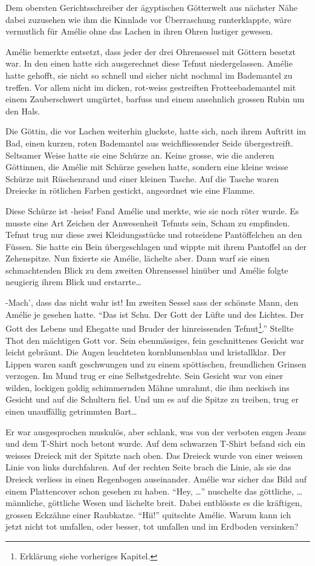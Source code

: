 \documentclass[11pt,titlepage,a5paper]{book}
\begin{document}
Dem obersten Gerichtsschreiber der ägyptischen Götterwelt aus nächster Nähe dabei zuzusehen wie ihm die Kinnlade vor Überraschung runterklappte, wäre vermutlich für Amélie ohne das Lachen in ihren Ohren lustiger gewesen.

Amélie bemerkte entsetzt, dass jeder der drei Ohrensessel mit Göttern besetzt war. In den einen hatte sich ausgerechnet diese Tefnut niedergelassen. Amélie hatte gehofft, sie nicht so schnell und sicher nicht nochmal im Bademantel zu treffen. Vor allem nicht im dicken, rot-weiss gestreiften Frotteebademantel mit einem Zauberschwert umgürtet, barfuss und einem ansehnlich grossen Rubin um den Hals. 

Die Göttin, die vor Lachen weiterhin gluckste, hatte sich, nach ihrem Auftritt im Bad, einen kurzen, roten Bademantel aus weichfliessender Seide übergestreift. Seltsamer Weise hatte sie eine Schürze an. Keine grosse, wie die anderen Göttinnen, die Amélie mit Schürze gesehen hatte, sondern eine kleine weisse Schürze mit Rüschenrand und einer kleinen Tasche. Auf die Tasche waren Dreiecke in rötlichen Farben gestickt, angeordnet wie eine Flamme.

 Diese Schürze ist -heiss! Fand Amélie und merkte, wie sie noch röter wurde. Es musste eine Art Zeichen der Anwesenheit Tefnuts sein, Scham zu empfinden. Tefnut trug nur diese zwei Kleidungsstücke und rotseidene Pantöffelchen an den Füssen.  Sie hatte ein Bein übergeschlagen und wippte mit ihrem Pantoffel an der Zehenspitze. Nun fixierte sie Amélie, lächelte aber. Dann warf sie einen schmachtenden Blick zu dem zweiten Ohrensessel hinüber und Amélie folgte neugierig ihrem Blick und erstarrte\dots

-Mach', dass das nicht wahr ist! Im zweiten Sessel sass der schönste Mann, den Amélie je gesehen hatte. "`Das ist Schu. Der Gott der Lüfte und des Lichtes. Der Gott des Lebens und Ehegatte und Bruder der hinreissenden Tefnut\footnote{Erklärung siehe vorheriges Kapitel.}."' Stellte Thot den mächtigen  Gott vor. Sein ebenmässiges, fein geschnittenes Gesicht war leicht gebräunt. Die Augen leuchteten kornblumenblau und kristallklar. Der Lippen waren sanft geschwungen und zu einem spöttischen, freundlichen Grinsen verzogen. Im Mund trug er eine Selbstgedrehte. Sein Gesicht war von einer wilden, lockigen goldig schimmernden Mähne umrahmt, die ihm neckisch ins Gesicht und auf die Schultern fiel. Und um es auf die Spitze zu treiben, trug er einen unauffällig getrimmten Bart\dots

Er war ausgesprochen muskulös, aber schlank, was von der verboten engen Jeans und dem T-Shirt noch betont wurde. Auf dem schwarzen T-Shirt befand sich ein weisses Dreieck mit der Spitzte nach oben. Das Dreieck wurde von einer weissen Linie von links durchfahren. Auf der rechten Seite brach die Linie, als sie das Dreieck verliess in einen Regenbogen auseinander. Amélie war sicher das Bild auf einem Plattencover schon gesehen zu haben.
"`Hey, \dots"' nuschelte das göttliche, \dots männliche, göttliche Wesen und lächelte breit. Dabei entblösste es die kräftigen, grossen Eckzähne einer Raubkatze. "`Hii!"' quitschte Amélie. Warum kann ich jetzt nicht tot umfallen, oder besser, tot umfallen und im Erdboden versinken? 
\end{document}
